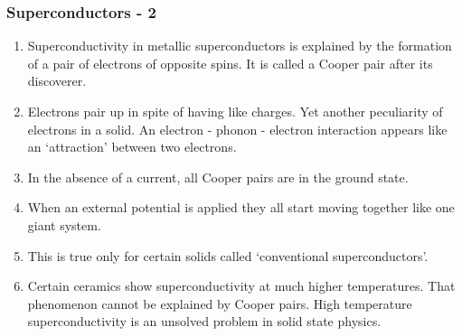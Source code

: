 \documentclass{beamer}
\begin{document}
\begin{frame}
\frametitle{Superconductors - 2}
\begin{enumerate}
\item Superconductivity in metallic superconductors is explained by the 
formation of a pair of electrons of opposite spins. It is called a Cooper pair
after its discoverer.
\item Electrons pair up in spite of having like charges. Yet another peculiarity
of electrons in a solid. An electron - phonon - electron interaction appears 
like an `attraction' between two electrons.
\item In the absence of a current, all Cooper pairs are in the ground state.
\item When an external potential is applied they all start moving together like
one giant system.
\item This is true only for certain solids called `conventional superconductors'.
\item Certain ceramics show superconductivity at much higher temperatures. That
phenomenon cannot be explained by Cooper pairs. High temperature 
superconductivity is an unsolved problem in solid state physics.
\end{enumerate}
\end{frame}
\end{document}
